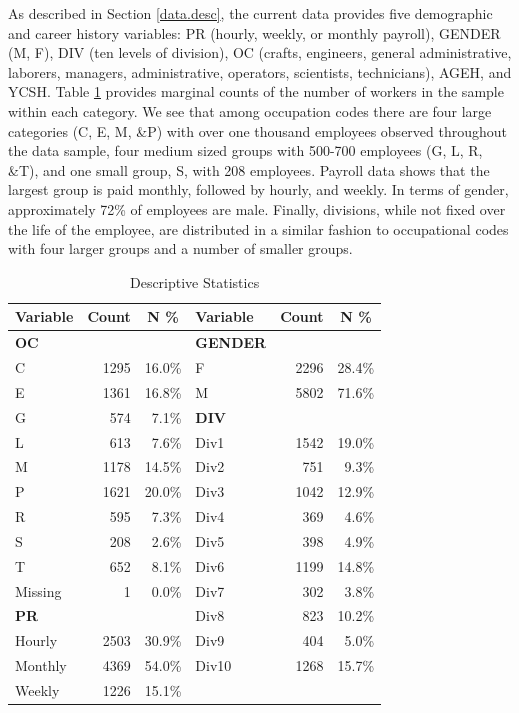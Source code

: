 \documentclass[12pt,letterpaper]{article}
\begin{document}
As described in Section \ref{data.desc}, the current data provides five demographic and career history variables: PR (hourly, weekly, or monthly payroll), GENDER (M, F), DIV (ten levels of division), OC (crafts, engineers, general administrative, laborers, managers, administrative, operators, scientists, technicians), AGEH, and YCSH. Table \ref{tab:descriptive} provides marginal counts of the number of workers in the sample within each category.  We see that among occupation codes there are four large categories (C, E, M, \&P)  with over one thousand employees observed throughout the data sample, four medium sized groups with 500-700 employees (G, L, R, \&T), and one small group, S, with 208 employees.  Payroll data shows that the largest group is paid monthly, followed by hourly, and weekly.  In terms of gender, approximately 72\% of employees are male. Finally, divisions, while not fixed over the life of the employee, are distributed in a similar fashion to occupational codes with four larger groups and a number of smaller groups.
\begin{table}[htbp]
	\centering
	\scriptsize
	\renewcommand{\arraystretch}{1.5}
	\caption{Descriptive Statistics}
	\begin{tabular}{lrrlrr}
		\toprule
		\textbf{Variable}	& \multicolumn{1}{c}{\textbf{Count}} & \multicolumn{1}{c}{\textbf{N \%}}  &   \textbf{Variable}    & \multicolumn{1}{c}{\textbf{Count}} & \multicolumn{1}{c}{\textbf{N \%}} \\
		\midrule
		\textbf{OC} &       &       & \textbf{GENDER} &       &  \\
		C     & 1295  & 16.0\% & F     & 2296  & 28.4\% \\
		E     & 1361  & 16.8\% & M     & 5802  & 71.6\% \\
		G     & 574   & 7.1\% & \textbf{DIV} &       &  \\
		L     & 613   & 7.6\% & Div1 & 1542  & 19.0\% \\
		M     & 1178  & 14.5\% & Div2 & 751   & 9.3\% \\
		P     & 1621  & 20.0\% & Div3 & 1042  & 12.9\% \\
		R     & 595   & 7.3\% & Div4 & 369   & 4.6\% \\
		S     & 208   & 2.6\% & Div5 & 398   & 4.9\% \\
		T     & 652   & 8.1\% & Div6 & 1199  & 14.8\% \\
		Missing & 1     & 0.0\% & Div7 & 302   & 3.8\% \\
		\textbf{PR} &  &   & Div8 & 823   & 10.2\% \\
		Hourly & 2503  & 30.9\% & Div9 & 404   & 5.0\% \\
		Monthly & 4369  & 54.0\% & Div10 & 1268  & 15.7\% \\
		Weekly & 1226  & 15.1\% &       &       &  \\
		\bottomrule
	\end{tabular}%
	\label{tab:descriptive}%
\end{table}%
\end{document}
